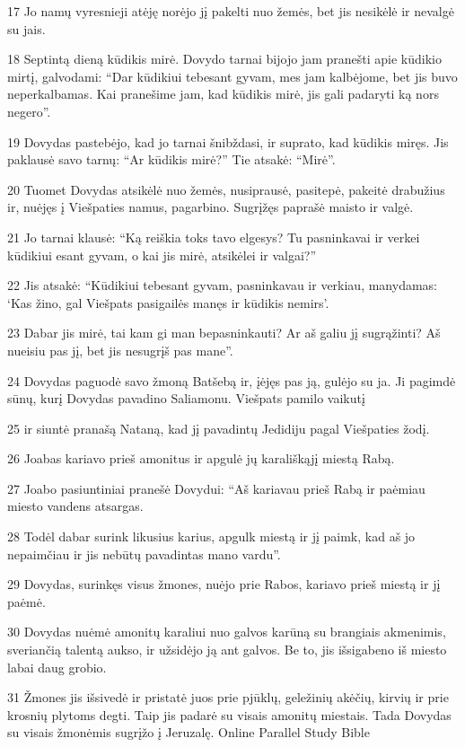 \par 17 Jo namų vyresnieji atėję norėjo jį pakelti nuo žemės, bet jis nesikėlė ir nevalgė su jais. 
\par 18 Septintą dieną kūdikis mirė. Dovydo tarnai bijojo jam pranešti apie kūdikio mirtį, galvodami: “Dar kūdikiui tebesant gyvam, mes jam kalbėjome, bet jis buvo neperkalbamas. Kai pranešime jam, kad kūdikis mirė, jis gali padaryti ką nors negero”. 
\par 19 Dovydas pastebėjo, kad jo tarnai šnibždasi, ir suprato, kad kūdikis miręs. Jis paklausė savo tarnų: “Ar kūdikis mirė?” Tie atsakė: “Mirė”. 
\par 20 Tuomet Dovydas atsikėlė nuo žemės, nusiprausė, pasitepė, pakeitė drabužius ir, nuėjęs į Viešpaties namus, pagarbino. Sugrįžęs paprašė maisto ir valgė. 
\par 21 Jo tarnai klausė: “Ką reiškia toks tavo elgesys? Tu pasninkavai ir verkei kūdikiui esant gyvam, o kai jis mirė, atsikėlei ir valgai?” 
\par 22 Jis atsakė: “Kūdikiui tebesant gyvam, pasninkavau ir verkiau, manydamas: ‘Kas žino, gal Viešpats pasigailės manęs ir kūdikis nemirs’. 
\par 23 Dabar jis mirė, tai kam gi man bepasninkauti? Ar aš galiu jį sugrąžinti? Aš nueisiu pas jį, bet jis nesugrįš pas mane”. 
\par 24 Dovydas paguodė savo žmoną Batšebą ir, įėjęs pas ją, gulėjo su ja. Ji pagimdė sūnų, kurį Dovydas pavadino Saliamonu. Viešpats pamilo vaikutį 
\par 25 ir siuntė pranašą Nataną, kad jį pavadintų Jedidiju pagal Viešpaties žodį. 
\par 26 Joabas kariavo prieš amonitus ir apgulė jų karališkąjį miestą Rabą. 
\par 27 Joabo pasiuntiniai pranešė Dovydui: “Aš kariavau prieš Rabą ir paėmiau miesto vandens atsargas. 
\par 28 Todėl dabar surink likusius karius, apgulk miestą ir jį paimk, kad aš jo nepaimčiau ir jis nebūtų pavadintas mano vardu”. 
\par 29 Dovydas, surinkęs visus žmones, nuėjo prie Rabos, kariavo prieš miestą ir jį paėmė. 
\par 30 Dovydas nuėmė amonitų karaliui nuo galvos karūną su brangiais akmenimis, sveriančią talentą aukso, ir užsidėjo ją ant galvos. Be to, jis išsigabeno iš miesto labai daug grobio. 
\par 31 Žmones jis išsivedė ir pristatė juos prie pjūklų, geležinių akėčių, kirvių ir prie krosnių plytoms degti. Taip jis padarė su visais amonitų miestais. Tada Dovydas su visais žmonėmis sugrįžo į Jeruzalę.
Online Parallel Study Bible



